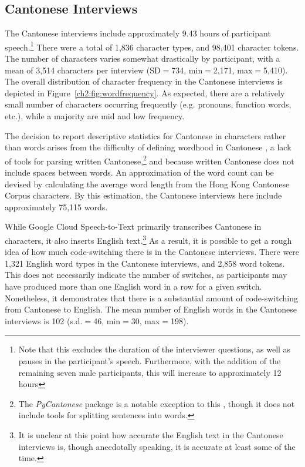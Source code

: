 \subsection{Cantonese Interviews}\label{ch2:subsec:cantonese_descriptive}
The Cantonese interviews include approximately 9.43 hours of participant speech.\footnote{Note that this excludes the duration of the interviewer questions, as well as pauses in the participant's speech. Furthermore, with the addition of the remaining seven male participants, this will increase to approximately 12 hours} There were a total of 1,836 character types, and 98,401 character tokens. The number of characters varies somewhat drastically by participant, with a mean of 3,514 characters per interview (SD$=$734, min$=$2,171, max$=$5,410). The overall distribution of character frequency in the Cantonese interviews is depicted in Figure~\ref{ch2:fig:wordfrequency}. As expected, there are a relatively small number of characters occurring frequently (e.g. pronouns, function words, etc.), while a majority are mid and low frequency. 

The decision to report descriptive statistics for Cantonese in characters rather than words arises from the difficulty of defining wordhood in Cantonese \citep{wong_2006_fusion}, a lack of tools for parsing written Cantonese,\footnote{The \textit{PyCantonese} package is a notable exception to this \citep{lee_2018_pycantonese}, though it does not include tools for splitting sentences into words.} and because written Cantonese does not include spaces between words. An approximation of the word count can be devised by calculating the average word length from the Hong Kong Cantonese Corpus \citep{luke_2015_hkc} characters. By this estimation, the Cantonese interviews here include approximately 75,115 words.

While Google Cloud Speech-to-Text primarily transcribes Cantonese in characters, it also inserts English text.\footnote{It is unclear at this point how accurate the English text in the Cantonese interviews is, though anecdotally speaking, it is accurate at least some of the time.} As a result, it is possible to get a rough idea of how much code-switching there is in the Cantonese interviews. There were 1,321 English word types in the Cantonese interviews, and 2,858 word tokens. This does not necessarily indicate the number of switches, as participants may have produced more than one English word in a row for a given switch. Nonetheless, it demonstrates that there is a substantial amount of code-switching from Cantonese to English. The mean number of English words in the Cantonese interviews is 102 (s.d.$=$46, min$=$30, max$=$198). 

